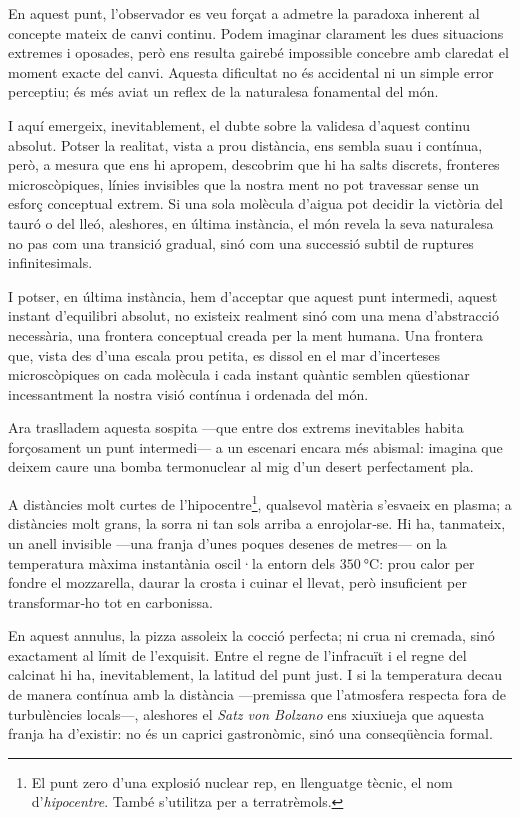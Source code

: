 En aquest punt, l'observador es veu forçat a admetre la paradoxa inherent al concepte mateix de canvi continu. Podem imaginar clarament les dues situacions extremes i oposades, però ens resulta gairebé impossible concebre amb claredat el moment exacte del canvi. Aquesta dificultat no és accidental ni un simple error perceptiu; és més aviat un reflex de la naturalesa fonamental del món.

I aquí emergeix, inevitablement, el dubte sobre la validesa d'aquest continu absolut. Potser la realitat, vista a prou distància, ens sembla suau i contínua, però, a mesura que ens hi apropem, descobrim que hi ha salts discrets, fronteres microscòpiques, línies invisibles que la nostra ment no pot travessar sense un esforç conceptual extrem. Si una sola molècula d'aigua pot decidir la victòria del tauró o del lleó, aleshores, en última instància, el món revela la seva naturalesa no pas com una transició gradual, sinó com una successió subtil de ruptures infinitesimals.

I potser, en última instància, hem d'acceptar que aquest punt intermedi, aquest instant d'equilibri absolut, no existeix realment sinó com una mena d'abstracció necessària, una frontera conceptual creada per la ment humana. Una frontera que, vista des d'una escala prou petita, es dissol en el mar d'incerteses microscòpiques on cada molècula i cada instant quàntic semblen qüestionar incessantment la nostra visió contínua i ordenada del món.

\par\bigskip
Ara traslladem aquesta sospita —que entre dos extrems inevitables habita
forçosament un punt intermedi— a un escenari encara més abismal:  
imagina que deixem caure una bomba termonuclear al mig d’un desert
perfectament pla.  

A distàncies molt curtes de l’hipocentre\footnote{%
El punt zero d’una explosió nuclear rep, en llenguatge tècnic, el nom
d’\emph{hipocentre}. També s'utilitza per a terratrèmols.}, qualsevol matèria s’esvaeix
en plasma; a distàncies molt grans, la sorra ni tan sols arriba a
enrojolar‑se.  Hi ha, tanmateix, un anell invisible —una franja d’unes
poques desenes de metres— on la temperatura màxima instantània
oscil·la entorn dels \(350\ \si{\celsius}\): prou calor per fondre el
mozzarella, daurar la crosta i cuinar el llevat, però insuficient per
transformar‑ho tot en carbonissa.

En aquest annulus, la pizza assoleix la cocció perfecta; ni crua ni
cremada, sinó exactament al límit de l’exquisit.  Entre el regne de
l’infracuït i el regne del calcinat hi ha, inevitablement, la latitud
del punt just.  I si la temperatura decau de manera contínua amb la
distància —premissa que l’atmosfera respecta fora de turbulències
locals—, aleshores el \emph{Satz von Bolzano} ens xiuxiueja que aquesta
franja ha d’existir: no és un caprici gastronòmic, sinó una conseqüència
formal.

